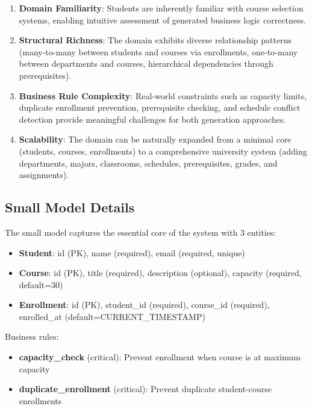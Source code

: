 \documentclass[11pt,a4paper]{article}
\begin{document}
\begin{enumerate}[leftmargin=*]
    \item \textbf{Domain Familiarity}: Students are inherently familiar with course selection systems, enabling intuitive assessment of generated business logic correctness.
    \item \textbf{Structural Richness}: The domain exhibits diverse relationship patterns (many-to-many between students and courses via enrollments, one-to-many between departments and courses, hierarchical dependencies through prerequisites).
    \item \textbf{Business Rule Complexity}: Real-world constraints such as capacity limits, duplicate enrollment prevention, prerequisite checking, and schedule conflict detection provide meaningful challenges for both generation approaches.
    \item \textbf{Scalability}: The domain can be naturally expanded from a minimal core (students, courses, enrollments) to a comprehensive university system (adding departments, majors, classrooms, schedules, prerequisites, grades, and assignments).
\end{enumerate}

\subsection{Small Model Details}

The small model captures the essential core of the system with 3 entities:

\begin{itemize}
    \item \textbf{Student}: id (PK), name (required), email (required, unique)
    \item \textbf{Course}: id (PK), title (required), description (optional), capacity (required, default=30)
    \item \textbf{Enrollment}: id (PK), student\_id (required), course\_id (required), enrolled\_at (default=CURRENT\_TIMESTAMP)
\end{itemize}

Business rules:
\begin{itemize}
    \item \textbf{capacity\_check} (critical): Prevent enrollment when course is at maximum capacity
    \item \textbf{duplicate\_enrollment} (critical): Prevent duplicate student-course enrollments
\end{itemize}
\end{document}
